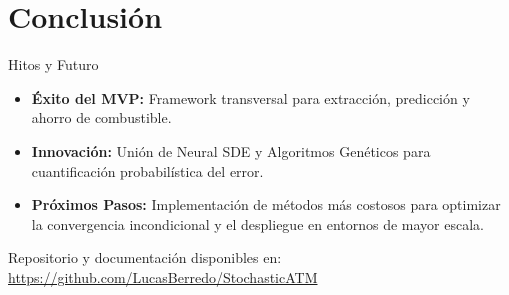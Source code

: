 \documentclass[aspectratio=169]{beamer}
\begin{document}
\section{Conclusión}

\begin{frame}{Hitos y Futuro}
  \begin{itemize}
    \item \textbf{Éxito del MVP:} Framework transversal para extracción, predicción y ahorro de combustible.
    \item \textbf{Innovación:} Unión de Neural SDE y Algoritmos Genéticos para cuantificación probabilística del error.
    \item \textbf{Próximos Pasos:} Implementación de métodos más costosos para optimizar la convergencia incondicional y el despliegue en entornos de mayor escala.
  \end{itemize}
  \begin{center}
    \vspace{0.5cm}
    \small{Repositorio y documentación disponibles en: \\ \url{https://github.com/LucasBerredo/StochasticATM}}
  \end{center}
\end{frame}
\end{document}
